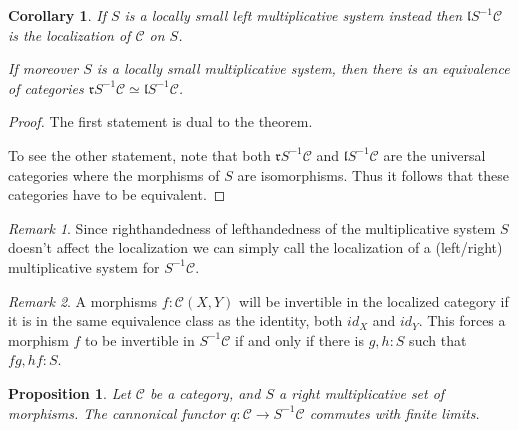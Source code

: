 \documentclass[11pt]{article}
\newtheorem{corollary}{Corollary}[theorem]
\newtheorem{prop}[theorem]{Proposition}
\theoremstyle{definition}
\theoremstyle{remark}
\newtheorem*{remark}{Remark}
\begin{document}
            \begin{corollary}
                If $S$ is a locally small left multiplicative system instead then $\mathfrak{l}S^{-1}\mathcal{C}$ is the localization of $\mathcal{C}$ on $S$.

                If moreover $S$ is a locally small multiplicative system, then there is an equivalence of categories $\mathfrak{r}S^{-1}\mathcal{C}\simeq\mathfrak{l}S^{-1}\mathcal{C}$.
            \end{corollary}

            \begin{proof}
                The first statement is dual to the theorem.

                To see the other statement, note that both $\mathfrak{r}S^{-1}\mathcal{C}$ and $\mathfrak{l}S^{-1}\mathcal{C}$ are the universal categories where the morphisms of $S$ are isomorphisms. Thus it follows that these categories have to be equivalent.
            \end{proof}

            \begin{remark}
                Since righthandedness of lefthandedness of the multiplicative system $S$ doesn't affect the localization we can simply call the localization of a (left/right) multiplicative system for $S^{-1}\mathcal{C}$.
            \end{remark}

            \begin{remark}
                A morphisms $f:\mathcal{C}(X,Y)$ will be invertible in the localized category if it is in the same equivalence class as the identity, both $id_X$ and $id_Y$. This forces a morphism $f$ to be invertible in $S^{-1}\mathcal{C}$ if and only if there is $g,h:S$ such that $fg,hf:S$.
            \end{remark}

            \begin{prop}
                Let $\mathcal{C}$ be a category, and $S$ a right multiplicative set of morphisms. The cannonical functor $q:\mathcal{C}\rightarrow S^{-1}\mathcal{C}$ commutes with finite limits.
            \end{prop}
\end{document}
